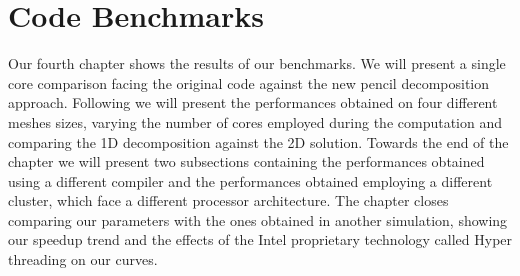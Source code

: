 \chapter{Code Benchmarks}
Our fourth chapter shows the results of our benchmarks. We will present a single core comparison facing the original code against the new pencil decomposition approach. Following we will present the performances obtained on four different meshes sizes, varying the number of cores employed during the computation and comparing the 1D decomposition against the 2D solution. Towards the end of the chapter we will present two subsections containing the performances obtained using a different compiler and the performances obtained employing a different cluster, which face a different processor architecture. The chapter closes comparing our parameters with the ones obtained in another simulation, showing our speedup trend and the effects of the Intel proprietary technology called Hyper threading on our curves.


